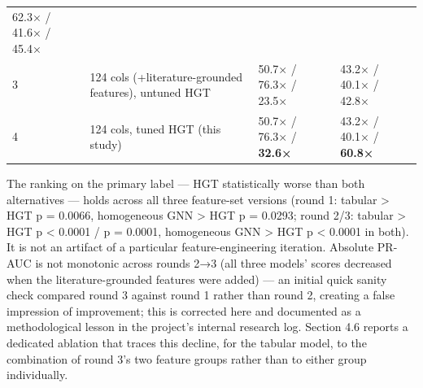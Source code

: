 \documentclass[11pt,]{article}
\begin{document}
\begin{longtable}[]{@{}llll@{}}
\begin{minipage}[t]{0.22\columnwidth}
62.3× / 41.6× / 45.4×\strut
\end{minipage}\tabularnewline
\begin{minipage}[t]{0.22\columnwidth}\raggedright
3\strut
\end{minipage} & \begin{minipage}[t]{0.22\columnwidth}\raggedright
124 cols (+literature-grounded features), untuned HGT\strut
\end{minipage} & \begin{minipage}[t]{0.22\columnwidth}\raggedright
50.7× / 76.3× / 23.5×\strut
\end{minipage} & \begin{minipage}[t]{0.22\columnwidth}\raggedright
43.2× / 40.1× / 42.8×\strut
\end{minipage}\tabularnewline
\begin{minipage}[t]{0.22\columnwidth}\raggedright
4\strut
\end{minipage} & \begin{minipage}[t]{0.22\columnwidth}\raggedright
124 cols, tuned HGT (this study)\strut
\end{minipage} & \begin{minipage}[t]{0.22\columnwidth}\raggedright
50.7× / 76.3× / \textbf{32.6×}\strut
\end{minipage} & \begin{minipage}[t]{0.22\columnwidth}\raggedright
43.2× / 40.1× / \textbf{60.8×}\strut
\end{minipage}\tabularnewline
\bottomrule
\end{longtable}

The ranking on the primary label --- HGT statistically worse than both
alternatives --- holds across all three feature-set versions (round 1:
tabular \textgreater{} HGT p = 0.0066, homogeneous GNN \textgreater{}
HGT p = 0.0293; round 2/3: tabular \textgreater{} HGT p \textless{}
0.0001 / p = 0.0001, homogeneous GNN \textgreater{} HGT p \textless{}
0.0001 in both). It is not an artifact of a particular
feature-engineering iteration. Absolute PR-AUC is not monotonic across
rounds 2→3 (all three models' scores decreased when the
literature-grounded features were added) --- an initial quick sanity
check compared round 3 against round 1 rather than round 2, creating a
false impression of improvement; this is corrected here and documented
as a methodological lesson in the project's internal research log.
Section 4.6 reports a dedicated ablation that traces this decline, for
the tabular model, to the combination of round 3's two feature groups
rather than to either group individually.
\end{document}
